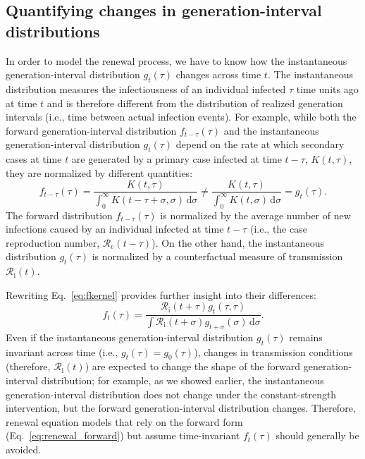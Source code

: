 \documentclass[12pt]{article}
\newcommand{\eref}[1]{Eq.~\ref{eq:#1}}
\newcommand{\Rx}[1]{\ensuremath{{\mathcal R}_{#1}}\xspace}
\newcommand{\Rc}{\Rx{\mathrm{c}}}
\newcommand{\Ri}{\Rx{\mathrm{i}}}
\newcommand{\dd}[1]{\ensuremath{\, \mathrm{d}#1}}
\newcommand{\dsigma}{\dd{\sigma}}
\begin{document}
\subsection{Quantifying changes in generation-interval distributions}
\label{ss:instg}

In order to model the renewal process, we have to know how the instantaneous generation-interval distribution $g_t(\tau)$ changes across time $t$.
The instantaneous distribution measures the infectiousness of an individual infected $\tau$ time units ago at time $t$ and is therefore different from the distribution of realized generation intervals (i.e., time between actual infection events).
For example, while both the forward generation-interval distribution $f_{t-\tau}(\tau)$ and the instantaneous generation-interval distribution $g_t(\tau)$ depend on the rate at which secondary cases at time $t$ are generated by a primary case infected at time $t-\tau$, $K(t, \tau)$, they are normalized by different quantities:
\begin{equation}
f_{t-\tau}(\tau) = \frac{K(t,\tau)}{\int_0^\infty K(t-\tau+\sigma,\sigma) \dsigma} \neq \frac{K(t,\tau)}{\int_0^\infty K(t,\sigma) \dsigma} = g_t(\tau).
\end{equation}
The forward distribution $f_{t-\tau}(\tau)$ is normalized by the average number of new infections caused by an individual infected at time $t-\tau$ (i.e., the case reproduction number, $\Rc(t-\tau)$).
On the other hand, the instantaneous distribution $g_t(\tau)$ is normalized by a counterfactual measure of transmission $\Ri(t)$.

Rewriting \eref{fkernel} provides further insight into their differences:
\begin{equation}
f_t(\tau) = \frac{\Ri(t + \tau) g_t(\tau, \tau)}{\int \Ri(t + \sigma) g_{t+\sigma}(\sigma) \dsigma}.
\end{equation}
Even if the instantaneous generation-interval distribution $g_t(\tau)$ remains invariant across time (i.e., $g_t(\tau) = g_0(\tau)$), changes in transmission conditions (therefore, $\Ri(t)$) are expected to change the shape of the forward generation-interval distribution;
for example, as we showed earlier, the instantaneous generation-interval distribution does not change under the constant-strength intervention, but the forward generation-interval distribution changes.
Therefore, renewal equation models that rely on the forward form (\eref{renewal_forward}) but assume time-invariant $f_t(\tau)$ should generally be avoided.
\end{document}
